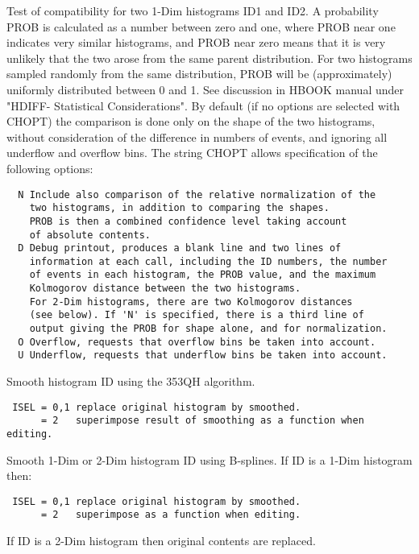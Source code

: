 \BEGARG
{}
\ENDARG
\BEGTEXT
Test of compatibility for two 1-Dim histograms ID1 and ID2.
A probability PROB is calculated as a number between zero and one,
where PROB near
one indicates very similar histograms, and PROB near zero
means that it is very unlikely that the two arose from the same
parent distribution.
For two histograms sampled randomly from the same distribution,
PROB will be (approximately) uniformly distributed between 0 and 1.
See discussion in HBOOK manual under "HDIFF- Statistical Considerations".
By default (if no options are selected with CHOPT)
the comparison is done only
on the shape of the two histograms, without consideration of
the difference in numbers of events, and ignoring all
underflow and overflow bins.
The string CHOPT allows specification of the following options:
\begin{verbatim}
  N Include also comparison of the relative normalization of the
    two histograms, in addition to comparing the shapes.
    PROB is then a combined confidence level taking account
    of absolute contents.
  D Debug printout, produces a blank line and two lines of
    information at each call, including the ID numbers, the number
    of events in each histogram, the PROB value, and the maximum
    Kolmogorov distance between the two histograms.
    For 2-Dim histograms, there are two Kolmogorov distances
    (see below). If 'N' is specified, there is a third line of
    output giving the PROB for shape alone, and for normalization.
  O Overflow, requests that overflow bins be taken into account.
  U Underflow, requests that underflow bins be taken into account.
\end{verbatim}
\ENDTEXT

\BEGARG
{}
\ENDARG
\BEGTEXT
Smooth histogram ID using the 353QH algorithm.
\begin{verbatim}
 ISEL = 0,1 replace original histogram by smoothed.
      = 2   superimpose result of smoothing as a function when editing.
\end{verbatim}
\ENDTEXT

\BEGARG
{}
\ENDARG
\BEGTEXT
Smooth 1-Dim or 2-Dim histogram ID using B-splines.
If ID is a 1-Dim histogram then:
\begin{verbatim}
 ISEL = 0,1 replace original histogram by smoothed.
      = 2   superimpose as a function when editing.
\end{verbatim}
If ID is a 2-Dim histogram then original contents are replaced.
\ENDTEXT

